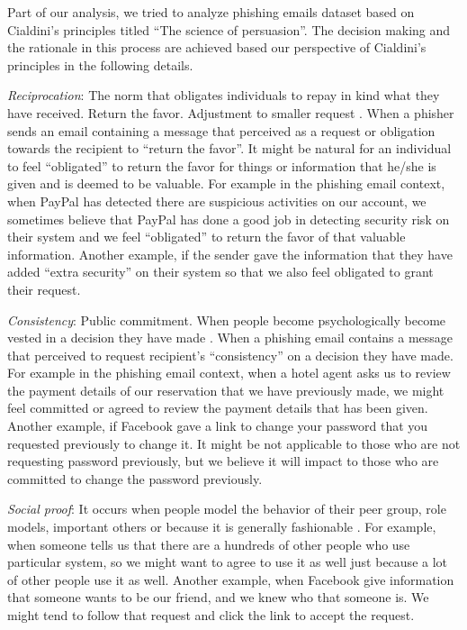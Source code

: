 Part of our analysis, we tried to analyze phishing emails dataset
based on Cialdini\textquoteright s principles titled \textquotedblleft The
science of persuasion\textquotedblright . The decision making and
the rationale in this process are achieved based our perspective of
Cialdini\textquoteright s principles in the following details.

\emph{Reciprocation}: The norm that obligates individuals to repay
in kind what they have received. Return the favor. Adjustment to smaller
request \cite{cialdini:2001}. When a phisher sends an email containing
a message that perceived as a request or obligation towards the recipient
to \textquotedblleft return the favor\textquotedblright . It might
be natural for an individual to feel \textquotedblleft obligated\textquotedblright{}
to return the favor for things or information that he/she is given
and is deemed to be valuable. For example in the phishing email context,
when PayPal has detected there are suspicious activities on our account,
we sometimes believe that PayPal has done a good job in detecting
security risk on their system and we feel \textquotedblleft obligated\textquotedblright{}
to return the favor of that valuable information. Another example,
if the sender gave the information that they have added \textquotedblleft extra
security\textquotedblright{} on their system so that we also feel
obligated to grant their request. 

\emph{Consistency}: Public commitment. When people become psychologically
become vested in a decision they have made \cite{workman:2008}. When
a phishing email contains a message that perceived to request recipient\textquoteright s
\textquotedblleft consistency\textquotedblright{} on a decision they
have made. For example in the phishing email context, when a hotel
agent asks us to review the payment details of our reservation that
we have previously made, we might feel committed or agreed to review
the payment details that has been given. Another example, if Facebook
gave a link to change your password that you requested previously
to change it. It might be not applicable to those who are not requesting
password previously, but we believe it will impact to those who are
committed to change the password previously. 

\emph{Social proof}: It occurs when people model the behavior of their
peer group, role models, important others or because it is generally
\textquotedbl{}fashionable\textquotedbl{} \cite{workman:2008}. For
example, when someone tells us that there are a hundreds of other
people who use particular system, so we might want to agree to use
it as well just because a lot of other people use it as well. Another
example, when Facebook give information that someone wants to be our
friend, and we knew who that someone is. We might tend to follow that
request and click the link to accept the request. 

